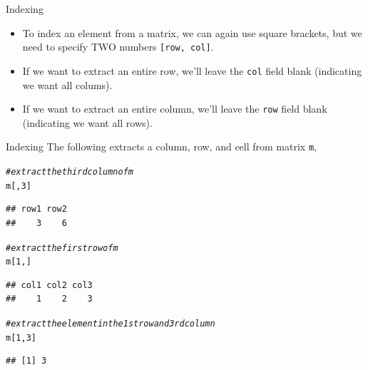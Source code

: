 \documentclass[xcolor=svgnames, 10pt]{beamer}
\makeatletter
\newcommand{\hlnum}[1]{\textcolor[rgb]{0.686,0.059,0.569}{#1}}%
\newcommand{\hlcom}[1]{\textcolor[rgb]{0.678,0.584,0.686}{\textit{#1}}}%
\newcommand{\hlstd}[1]{\textcolor[rgb]{0.345,0.345,0.345}{#1}}%
\newenvironment{kframe}{%
 \def\at@end@of@kframe{}%
 \ifinner\ifhmode%
  \def\at@end@of@kframe{\end{minipage}}%
  \begin{minipage}{\columnwidth}%
 \fi\fi%
 \def\FrameCommand##1{\hskip\@totalleftmargin \hskip-\fboxsep
 \colorbox{shadecolor}{##1}\hskip-\fboxsep
     \hskip-\linewidth \hskip-\@totalleftmargin \hskip\columnwidth}%
 \MakeFramed {\advance\hsize-\width
   \@totalleftmargin\z@ \linewidth\hsize
   \@setminipage}}%
 {\par\unskip\endMakeFramed%
 \at@end@of@kframe}
\newenvironment{knitrout}{}{} %
\makeatother
\begin{document}
\begin{frame}[fragile]{Indexing}
\begin{itemize}
\item To index an element from a matrix, we can again use square brackets, but we need to specify TWO numbers {\tt[row, col]}.
\item  If we want to extract an entire row, we'll leave the {\tt col} field blank (indicating we want all colums).
\item  If we want to extract an entire column, we'll leave the {\tt row} field blank (indicating we want all rows).
\end{itemize}
\end{frame}

\begin{frame}[fragile]{Indexing}
The following extracts a column, row, and cell from matrix {\tt m},
\begin{knitrout}\footnotesize
{}\color{fgcolor}\begin{kframe}
\begin{alltt}
\hlcom{# extract the third column of m}
\hlstd{m[,}\hlnum{3}\hlstd{]}
\end{alltt}
\begin{verbatim}
## row1 row2 
##    3    6
\end{verbatim}
\begin{alltt}
\hlcom{# extract the first row of m}
\hlstd{m[}\hlnum{1}\hlstd{,]}
\end{alltt}
\begin{verbatim}
## col1 col2 col3 
##    1    2    3
\end{verbatim}
\begin{alltt}
\hlcom{# extract the element in the 1st row and 3rd column}
\hlstd{m[}\hlnum{1}\hlstd{,}\hlnum{3}\hlstd{]}
\end{alltt}
\begin{verbatim}
## [1] 3
\end{verbatim}
\end{kframe}
\end{knitrout}
\end{frame}
\end{document}

